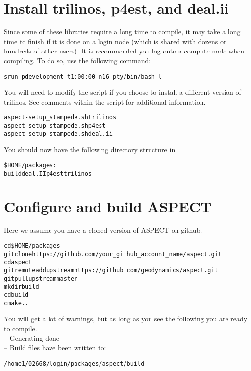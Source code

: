 \documentclass[12pt]{article}
\begin{document}
 \section{Install trilinos, p4est, and deal.ii}
 
Since some of these libraries require a long time to compile, it may take a long time to
finish if it is done on a login node (which is shared with dozens or hundreds of other users).
It is recommended you log onto a compute node when compiling. To do so, use the following
command: \\

\begin{alltt}\footnotesize
srun -p development -t 1:00:00 -n 16 --pty /bin/bash -l
\end{alltt}


\noindent You will need to modify the script if you choose to install a different version of trilinos.  See comments within the script for additional information.\\
 
 \begin{alltt}\footnotesize
 aspect-setup_stampede.sh trilinos 
 aspect-setup_stampede.sh p4est 
 aspect-setup_stampede.sh deal.ii    
 \end{alltt}
 
 \noindent You should now have the following directory structure in  \begin{alltt}\footnotesize \$HOME/packages:  \\
  
  build  deal.II  p4est  trilinos
\end{alltt}

 \section{Configure and build ASPECT}
 Here we assume you have a cloned version of ASPECT on github.  
 \begin{alltt}\footnotesize
 cd \$HOME/packages 
 git clone https://github.com/your\_github\_account\_name/aspect.git 
 cd aspect 
 git remote add upstream https://github.com/geodynamics/aspect.git 
 git pull upstream master  
 mkdir build 
 cd build 
 cmake ..  
 \end{alltt}

\noindent You will get a lot of warnings, but as long as you see the following you are ready to compile. \\
-- Generating done \\
-- Build files have been written to: \begin{alltt}\footnotesize /home1/02668/login/packages/aspect/build \end{alltt}
\end{document}
